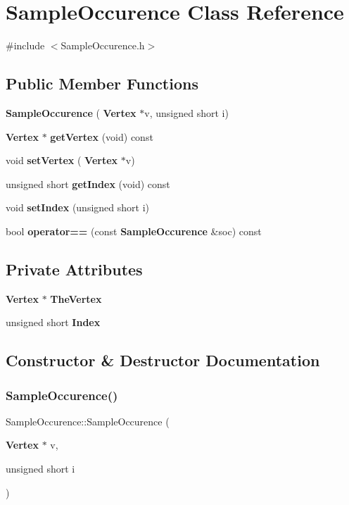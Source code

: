 \section{Sample\+Occurence Class Reference}
\label{classSampleOccurence}


{\ttfamily \#include $<$Sample\+Occurence.\+h$>$}

\subsection*{Public Member Functions}
\begin{DoxyCompactItemize}
\item 
\textbf{ Sample\+Occurence} (\textbf{ Vertex} $\ast$v, unsigned short i)
\item 
\textbf{ Vertex} $\ast$ \textbf{ get\+Vertex} (void) const
\item 
void \textbf{ set\+Vertex} (\textbf{ Vertex} $\ast$v)
\item 
unsigned short \textbf{ get\+Index} (void) const
\item 
void \textbf{ set\+Index} (unsigned short i)
\item 
bool \textbf{ operator==} (const \textbf{ Sample\+Occurence} \&soc) const
\end{DoxyCompactItemize}
\subsection*{Private Attributes}
\begin{DoxyCompactItemize}
\item 
\textbf{ Vertex} $\ast$ \textbf{ The\+Vertex}
\item 
unsigned short \textbf{ Index}
\end{DoxyCompactItemize}


\subsection{Constructor \& Destructor Documentation}
\mbox{\label{classSampleOccurence_a524f97e86b04b57b8c80c61aa1c1aa93}} 
\subsubsection{Sample\+Occurence()}
{\footnotesize\ttfamily Sample\+Occurence\+::\+Sample\+Occurence (\begin{DoxyParamCaption}\item[{\textbf{ Vertex} $\ast$}]{v,  }\item[{unsigned short}]{i }\end{DoxyParamCaption})\hspace{0.3cm}{\ttfamily [inline]}}



